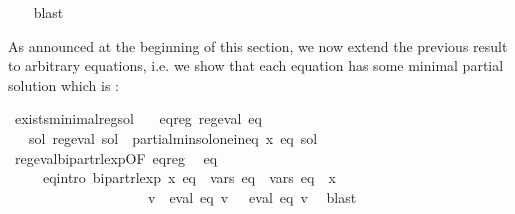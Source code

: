\begin{isabellebody}
\ \ \isamarkupfalse%
\ blast%
\endisatagproof
{\isafoldproof}%
%
\isadelimproof
\isanewline
%
\endisadelimproof
\isanewline
{}\isamarkupfalse%
%
\begin{isamarkuptext}%
As announced at the beginning of this section, we now extend the previous result to arbitrary
equations, i.e. we show that each equation has some minimal partial solution which is
:%
\end{isamarkuptext}\isamarkuptrue%
\isamarkupfalse%
\ exists{\isacharunderscore}{\kern0pt}minimal{\isacharunderscore}{\kern0pt}reg{\isacharunderscore}{\kern0pt}sol{\isacharcolon}{\kern0pt}\isanewline
\ \ \ eq{\isacharunderscore}{\kern0pt}reg{\isacharcolon}{\kern0pt}\ {\isachardoublequoteopen}reg{\isacharunderscore}{\kern0pt}eval\ eq{\isachardoublequoteclose}\isanewline
\ \ \ {\isachardoublequoteopen}{\isasymexists}sol{\isachardot}{\kern0pt}\ reg{\isacharunderscore}{\kern0pt}eval\ sol\ {\isasymand}\ partial{\isacharunderscore}{\kern0pt}min{\isacharunderscore}{\kern0pt}sol{\isacharunderscore}{\kern0pt}one{\isacharunderscore}{\kern0pt}ineq\ x\ eq\ sol{\isachardoublequoteclose}\isanewline
%
\isadelimproof
%
\endisadelimproof
%
\isatagproof
{}\isamarkupfalse%
\ {\isacharminus}{\kern0pt}\isanewline
\ \ \isamarkupfalse%
\ reg{\isacharunderscore}{\kern0pt}eval{\isacharunderscore}{\kern0pt}bipart{\isacharunderscore}{\kern0pt}rlexp{\isacharbrackleft}{\kern0pt}OF\ eq{\isacharunderscore}{\kern0pt}reg{\isacharbrackright}{\kern0pt}\ \isamarkupfalse%
\ eq{\isacharprime}{\kern0pt}\isanewline
\ \ \ \ \ eq{\isacharprime}{\kern0pt}{\isacharunderscore}{\kern0pt}intro{\isacharcolon}{\kern0pt}\ {\isachardoublequoteopen}bipart{\isacharunderscore}{\kern0pt}rlexp\ x\ eq{\isacharprime}{\kern0pt}\ {\isasymand}\ vars\ eq{\isacharprime}{\kern0pt}\ {\isacharequal}{\kern0pt}\ vars\ eq\ {\isasymunion}\ {\isacharbraceleft}{\kern0pt}x{\isacharbraceright}{\kern0pt}\ {\isasymand}\isanewline
\ \ \ \ \ \ \ \ \ \ \ \ \ \ \ \ \ \ \ \ {\isacharparenleft}{\kern0pt}{\isasymforall}v{\isachardot}{\kern0pt}\ {\isasymPsi}\ {\isacharparenleft}{\kern0pt}eval\ eq\ v{\isacharparenright}{\kern0pt}\ {\isacharequal}{\kern0pt}\ {\isasymPsi}\ {\isacharparenleft}{\kern0pt}eval\ eq{\isacharprime}{\kern0pt}\ v{\isacharparenright}{\kern0pt}{\isacharparenright}{\kern0pt}{\isachardoublequoteclose}\ \isamarkupfalse%
\ blast\isanewline
\ \ \isamarkupfalse%

\end{isabellebody}
